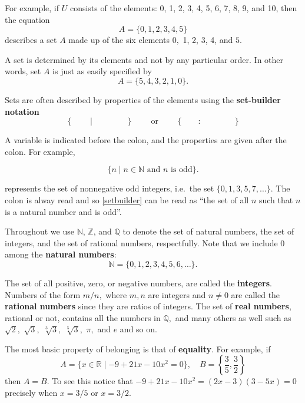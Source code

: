 \documentclass[
  letterpaper,
  10pt,
  reqno,
  twopage,
  openany]{book}
\theoremstyle{plain}
\theoremstyle{definition}
\theoremstyle{definition}
\theoremstyle{definition}
\theoremstyle{plain}
\theoremstyle{plain}
\theoremstyle{remark}
\begin{document}
For example, if \(U\) consists of the elements: 0, 1, 2, 3, 4, 5, 6, 7,
8, 9, and 10, then the equation \[
A=\{0,1,2,3,4,5\}
\] describes a set \(A\) made up of the six elements \(0,\) 1, 2, 3, 4,
and \(5.\)

A set is determined by its elements and not by any particular order. In
other words, set \(A\) is just as easily specified by \[
A=\{5,4,3,2,1,0\}.
\]

Sets are often described by properties of the elements using the
 \textbf{set-builder notation}\\
\[
\{ \qquad  \mid \qquad  \qquad \}
\qquad  \text{ or } \qquad  
\{ \qquad  :  \qquad  \qquad \}
\]

A variable is indicated before the colon, and the properties are given
after the colon. For example,

\begin{equation}
\label{setbuilder}
\{n \mid n\in \mathbb{N} \text{ and $n$ is odd}\}.
\end{equation}

represents the set of nonnegative odd integers, i.e.~the set
\(\{0,1,3,5,7,\ldots \}.\) The colon is alway read  and
so \eqref{setbuilder} can be read as ``the set of all \(n\) such that
\(n\) is a natural number and is odd''.

Throughout we use \(\mathbb{N}\), \(\mathbb{Z}\), and \(\mathbb{Q}\) to
denote the set of natural numbers, the set of integers, and the set of
rational numbers, respectfully. Note that we include 0 among the
 \textbf{natural numbers}: \[
\mathbb{N}=\{0,1,2,3,4,5,6,\ldots\}.
\]

The set of all positive, zero, or negative numbers, are called the
 \textbf{integers}. Numbers of the form \(m/n,\) where
\(m,n\) are integers and \(n\neq 0\) are called the
 \textbf{rational numbers} since they are ratios
of integers. The set of  \textbf{real numbers},
rational or not, contains all the numbers in \(\mathbb{Q},\) and many
others as well such as \(\sqrt{2},\) \(\sqrt{3},\) \(\sqrt[3]{3},\)
\(\sqrt[5]{3},\) \(\pi,\) and \(e\) and so on.

The most basic property of belonging is that of 
\textbf{equality}. For example, if \[
A=\{x\in \mathbb{R} \mid -9+21 x-10 x^2=0\}, \quad
B=\left\{\frac{3}{5},\frac{3}{2}\right\}
\] then \(A=B.\) To see this notice that
\(-9+21 x-10 x^2=(2x-3)(3-5x)=0\) precisely when \(x=3/5\) or \(x=3/2.\)
\end{document}

